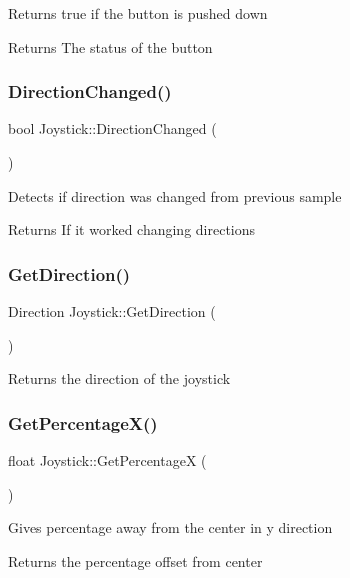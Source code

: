 Returns true if the button is pushed down \begin{DoxyReturn}{Returns}
The status of the button 
\end{DoxyReturn}
\hypertarget{class_joystick_ac905c75bcfe0701d3f2005d0c424cef3}{}\label{class_joystick_ac905c75bcfe0701d3f2005d0c424cef3} 
\subsubsection{\texorpdfstring{Direction\+Changed()}{DirectionChanged()}}
{\footnotesize\ttfamily bool Joystick\+::\+Direction\+Changed (\begin{DoxyParamCaption}{ }\end{DoxyParamCaption})}

Detects if direction was changed from previous sample \begin{DoxyReturn}{Returns}
If it worked changing directions 
\end{DoxyReturn}
\hypertarget{class_joystick_a8a8ad3f735c9e3e3a0bbd9ac0e73f4cc}{}\label{class_joystick_a8a8ad3f735c9e3e3a0bbd9ac0e73f4cc} 
\subsubsection{\texorpdfstring{Get\+Direction()}{GetDirection()}}
{\footnotesize\ttfamily Direction Joystick\+::\+Get\+Direction (\begin{DoxyParamCaption}{ }\end{DoxyParamCaption})}

Returns the direction of the joystick \hypertarget{class_joystick_a661653de4d298a9dccf316b1768206ea}{}\label{class_joystick_a661653de4d298a9dccf316b1768206ea} 
\subsubsection{\texorpdfstring{Get\+Percentage\+X()}{GetPercentageX()}}
{\footnotesize\ttfamily float Joystick\+::\+Get\+PercentageX (\begin{DoxyParamCaption}{ }\end{DoxyParamCaption})}

Gives percentage away from the center in y direction \begin{DoxyReturn}{Returns}
the percentage offset from center 
\end{DoxyReturn}
\hypertarget{class_joystick_af774eede094927838113b9ff3a8252bb}{}\label{class_joystick_af774eede094927838113b9ff3a8252bb} 
